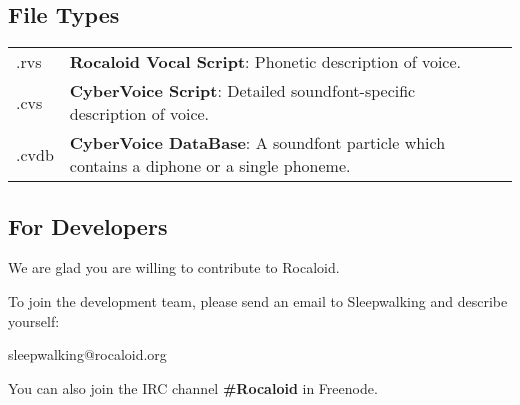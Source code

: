         \newpage

\subsection{File Types}

        \begin{tabular}{lll}
        	.rvs & \parbox{11cm}{\textbf{Rocaloid Vocal Script}: Phonetic description of voice.}\\
        	.cvs & \parbox{11cm}{\textbf{CyberVoice Script}: Detailed soundfont-specific description of voice.}\\
        	.cvdb & \parbox{11cm}{\textbf{CyberVoice DataBase}: A soundfont particle which contains a diphone or a single phoneme.}\\
        \end{tabular}

\subsection{For Developers}\indent

        We are glad you are willing to contribute to Rocaloid.
        
        To join the development team, please send an email to Sleepwalking and describe yourself:
        
        \bigskip
        
        sleepwalking@rocaloid.org
        
        \bigskip
        
        You can also join the IRC channel \textbf{\#Rocaloid} in Freenode.

